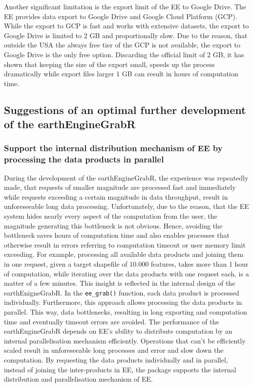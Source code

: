 Another significant limitation is the export limit of the EE to Google Drive.
The EE provides data export to Google Drive and Google Cloud Platform (GCP). While the export to GCP is fast and works with extensive datasets, the export to Google Drive is limited to 2 GB and proportionally slow. Due to the reason, that outside the USA the always free tier of the GCP is not available, the export to Google Drive is the only free option. Discarding the official limit of 2 GB, it has shown that keeping the size of the export small,  speeds up the process dramatically while export files larger 1 GB can result in hours of computation time. 

\subsection{Suggestions of an optimal further development of the earthEngineGrabR}

\subsubsection{Support the internal distribution mechanism of EE by processing the data products in parallel}

During the development of the earthEngineGrabR, the experience was repeatedly made, that requests of smaller magnitude are processed fast and immediately while requests exceeding a certain magnitude in data throughput, result in unforeseeable long data processing. Unfortunately, due to the reason, that the EE system hides nearly every aspect of the computation from the user, the magnitude generating this bottleneck is not obvious. Hence, avoiding the bottleneck saves hours of computation time and also enables processes that otherwise result in errors referring to computation timeout or user memory limit exceeding. For example, processing all available data products and joining them in one request, given a target shapefile of 10.000 features, takes more than 1 hour of computation, while iterating over the data products with one request each, is a matter of a few minutes. This insight is reflected in the internal design of the earthEnigneGrabR. In the \texttt{ee\_grab()} function, each data product is processed individually. Furthermore, this approach allows processing the data products in parallel. This way, data bottlenecks, resulting in long exporting and computation time and eventually timeout errors are avoided. The performance of the earthEngineGrabR depends on EE's ability to distribute computation by an internal parallelisation mechanism efficiently. Operations that can't be efficiently scaled result in unforeseeable long processes and error and slow down the computation. By requesting the data products individually and in parallel, instead of joining the inter-products in EE, the package supports the internal distribution and parallelisation mechanism of EE.

